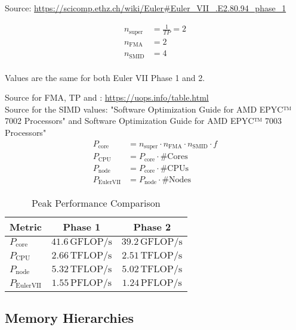 \documentclass[unicode,11pt,a4paper,oneside,numbers=endperiod,openany]{scrartcl}
\begin{document}
Source: \url{https://scicomp.ethz.ch/wiki/Euler#Euler_VII_.E2.80.94_phase_1}

\begin{align*}
n_{\mathrm{super}} &= \frac{1}{TP} = 2 \\
n_{\mathrm{FMA}} &= 2 \\
n_{\mathrm{SMID}} &= 4 \\
\end{align*}

Values are the same for both Euler VII Phase 1 and 2.

Source for FMA, TP and : \url{https://uops.info/table.html} \\
Source for the SIMD values: "Software Optimization Guide for AMD EPYC™ 7002 Processors" and Software Optimization Guide for AMD EPYC™ 7003 Processors"\\

\begin{align*}
P_{\mathrm{core}} &= n_{\mathrm{super}} \cdot n_{\mathrm{FMA}} \cdot n_{\mathrm{SMID}} \cdot f \\
P_{\mathrm{CPU}} &= P_{\mathrm{core}} \cdot \text{{\#Cores}} \\
P_{\mathrm{node}} &= P_{\mathrm{core}} \cdot \text{{\#CPUs}} \\
P_{\mathrm{Euler VII}} &= P_{\mathrm{node}} \cdot \text{{\#Nodes}}
\end{align*}

\begin{table}[ht]
\centering
\caption{Peak Performance Comparison}
\begin{tabular}{|l|c|c|}
\hline
\textbf{Metric} & \textbf{Phase 1} & \textbf{Phase 2} \\ \hline
$P_{\mathrm{core}}$ & $41.6 \, \mathrm{GFLOP/s}$ & $39.2 \, \mathrm{GFLOP/s}$ \\ \hline
$P_{\mathrm{CPU}}$ & $2.66 \, \mathrm{TFLOP/s}$ & $2.51 \, \mathrm{TFLOP/s}$ \\ \hline
$P_{\mathrm{node}}$ & $5.32 \, \mathrm{TFLOP/s}$ & $5.02 \, \mathrm{TFLOP/s}$ \\ \hline
$P_{\mathrm{Euler VII}}$ & $1.55 \, \mathrm{PFLOP/s}$ & $1.24 \, \mathrm{PFLOP/s}$ \\ \hline

\end{tabular}
\end{table}

\subsection{Memory Hierarchies}
\end{document}
